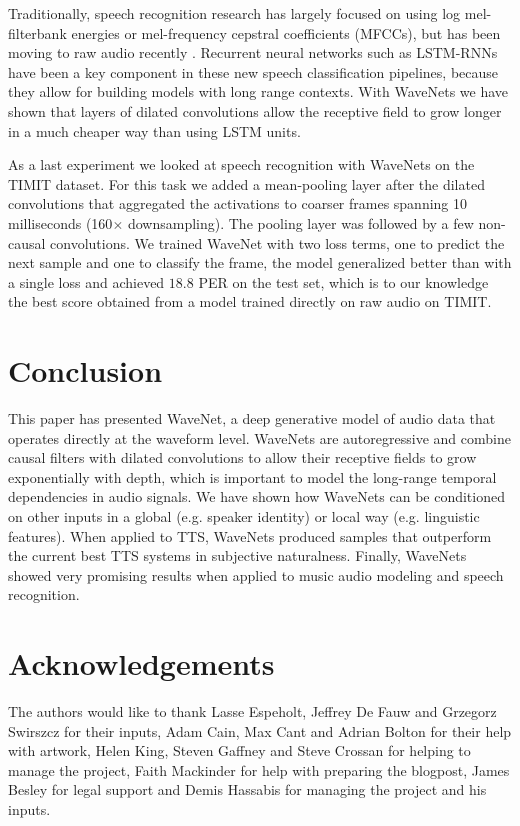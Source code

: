 \documentclass{article}
\makeatletter
\newcommand*{\eg}{e.g.\@\xspace}
\makeatother
\begin{document}
Traditionally, speech recognition research has largely focused on using log mel-filterbank energies or mel-frequency cepstral coefficients (MFCCs), but has been moving to raw audio recently \citep{palaz2013estimating,tuske2014acoustic,hoshen2015speech,sainath2015learning}. Recurrent neural networks such as LSTM-RNNs \citep{LSTM} have been a key component in these new speech classification pipelines, because they allow for building models with long range contexts. With WaveNets we have shown that layers of dilated convolutions allow the receptive field to grow longer in a much cheaper way than using LSTM units.

As a last experiment we looked at speech recognition with WaveNets on the TIMIT \citep{TIMIT} dataset. For this task we added a mean-pooling layer after the dilated convolutions that aggregated the activations to coarser frames spanning 10 milliseconds (160$\times$ downsampling). The pooling layer was followed by a few non-causal convolutions. We trained WaveNet with two loss terms, one to predict the next sample and one to classify the frame, the model generalized better than with a single loss and achieved $18.8$ PER on the test set, which is to our knowledge the best score obtained from a model trained directly on raw audio on TIMIT.
 
\section{Conclusion}
This paper has presented WaveNet, a deep generative model of audio data that operates directly at the waveform level. WaveNets are autoregressive and combine causal filters with dilated convolutions to allow their receptive fields to grow exponentially with depth, which is important to model the long-range temporal dependencies in audio signals. We have shown how WaveNets can be conditioned on other inputs in a global (\eg speaker identity) or local way (\eg linguistic features). When applied to TTS, WaveNets produced samples that outperform the current best TTS systems in subjective naturalness. Finally, WaveNets showed very promising results when applied to music audio modeling and speech recognition.
 
\section*{Acknowledgements} 
The authors would like to thank Lasse Espeholt, Jeffrey De Fauw and Grzegorz Swirszcz for their inputs, Adam Cain, Max Cant and Adrian Bolton for their help with artwork, Helen King, Steven Gaffney and Steve Crossan for helping to manage the project, Faith Mackinder for help  with preparing the blogpost, James Besley for legal support and Demis Hassabis for managing the project and his inputs.


\end{document}
